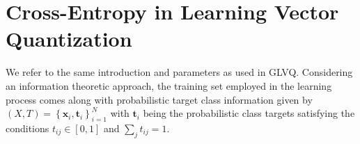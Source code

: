 \documentclass[english]{HSMW-Thesis}
\begin{document}
\section{Cross-Entropy in Learning Vector Quantization}
We refer to the same introduction and parameters  as used in GLVQ. Considering an information theoretic approach, the training set employed in the learning process comes along with probabilistic target class information given by \hspace{2pt}$(X,T) = \left\lbrace \mathbf{x}_i , \mathbf{t}_i\right\rbrace _{i=1}^{N}$ with\hspace{2pt} $\mathbf{t}_i$\hspace{2pt} being the probabilistic class targets satisfying the conditions\hspace{3pt}  $t_{ij}\in \left[ 0,1\right] $ \hspace{2pt}and \hspace{2pt}$\sum_{j}t_{ij} = 1$\cite{villmann2018probabilistic}.
\end{document}
